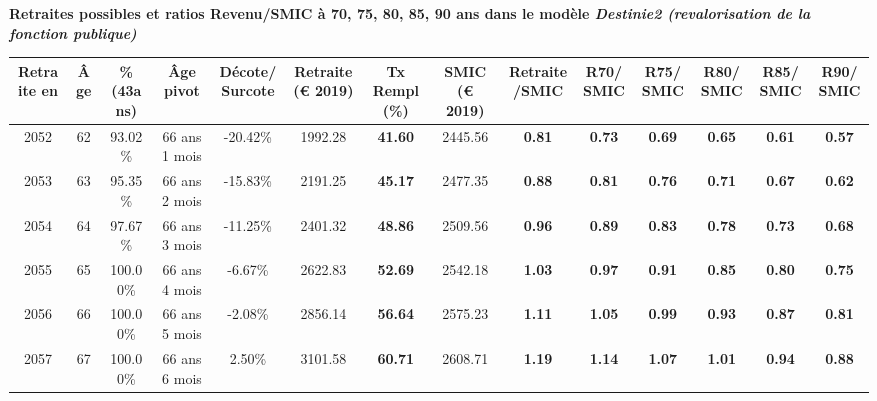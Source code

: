  \vspace{0.1cm} 
{\bf \noindent Retraites possibles et ratios Revenu/SMIC à 70, 75, 80, 85, 90 ans dans le modèle \emph{Destinie2 (revalorisation de la fonction publique)}}  
 
\begin{adjustbox}{max width=\textwidth} 
\begin{tabular}[htb]{|c|c||c|c|c||c|c||c|c||c|c|c|c|c|} 
\hline 
 Retraite en &  Âge &  \%(43ans) &  Âge pivot &  Décote/Surcote &  Retraite (\euro{} 2019) &  Tx Rempl(\%) &  SMIC (\euro{} 2019) &  Retraite/SMIC &  R70/SMIC &  R75/SMIC &  R80/SMIC &  R85/SMIC &  R90/SMIC \\ 
\hline \hline 
 2052 &  62 &  93.02\% &  66 ans 1 mois &  -20.42\% &  1992.28 &  {\bf 41.60} &  2445.56 &  {\bf {\color{red} 0.81}} &  {\bf {\color{red} 0.73}} &  {\bf {\color{red} 0.69}} &  {\bf {\color{red} 0.65}} &  {\bf {\color{red} 0.61}} &  {\bf {\color{red} 0.57}} \\ 
\hline 
 2053 &  63 &  95.35\% &  66 ans 2 mois &  -15.83\% &  2191.25 &  {\bf 45.17} &  2477.35 &  {\bf {\color{red} 0.88}} &  {\bf {\color{red} 0.81}} &  {\bf {\color{red} 0.76}} &  {\bf {\color{red} 0.71}} &  {\bf {\color{red} 0.67}} &  {\bf {\color{red} 0.62}} \\ 
\hline 
 2054 &  64 &  97.67\% &  66 ans 3 mois &  -11.25\% &  2401.32 &  {\bf 48.86} &  2509.56 &  {\bf {\color{red} 0.96}} &  {\bf {\color{red} 0.89}} &  {\bf {\color{red} 0.83}} &  {\bf {\color{red} 0.78}} &  {\bf {\color{red} 0.73}} &  {\bf {\color{red} 0.68}} \\ 
\hline 
 2055 &  65 &  100.00\% &  66 ans 4 mois &  -6.67\% &  2622.83 &  {\bf 52.69} &  2542.18 &  {\bf 1.03} &  {\bf {\color{red} 0.97}} &  {\bf {\color{red} 0.91}} &  {\bf {\color{red} 0.85}} &  {\bf {\color{red} 0.80}} &  {\bf {\color{red} 0.75}} \\ 
\hline 
 2056 &  66 &  100.00\% &  66 ans 5 mois &  -2.08\% &  2856.14 &  {\bf 56.64} &  2575.23 &  {\bf 1.11} &  {\bf 1.05} &  {\bf {\color{red} 0.99}} &  {\bf {\color{red} 0.93}} &  {\bf {\color{red} 0.87}} &  {\bf {\color{red} 0.81}} \\ 
\hline 
 2057 &  67 &  100.00\% &  66 ans 6 mois &  2.50\% &  3101.58 &  {\bf 60.71} &  2608.71 &  {\bf 1.19} &  {\bf 1.14} &  {\bf 1.07} &  {\bf 1.01} &  {\bf {\color{red} 0.94}} &  {\bf {\color{red} 0.88}} \\ 
\hline 
\hline 
\end{tabular} 
\end{adjustbox} 
 
